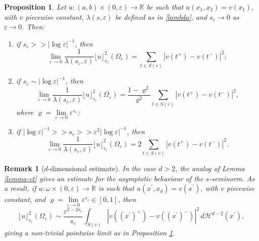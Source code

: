 \documentclass[11pt]{article}
\newtheorem{proposition}[definition]{Proposition}
\newtheorem{remark}[definition]{Remark}
\def\e{\varepsilon}
\begin{document}
\begin{proposition}\label{pconv} Let $u\colon (a,b)\times (0,\e)\to \mathbb R$ be such that $u(x_1,x_2)=v(x_1)$, with $v$ piecewise constant, $\lambda(s,\e)$ be defined as in \eqref{lambda}, and $s_\e\to 0$ as $\e\to 0$.  
Then: 
\begin{enumerate}
    \item[\rm (i)] if $s_\e>\!> |\log\e|^{-1}$, then 
    $$\lim_{\e\to 0}\frac{1}{\lambda(s_\e,\e)}\lfloor u \rfloor^2_{s_\e}(\Omega_\e)=\sum_{t\in S(v)}|v(t^+)-v(t^-)|^2;$$
    \item[\rm (ii)] if $s_\e\sim |\log\e|^{-1}$, then 
 $$\lim_{\e\to 0}\frac{1}{\lambda(s_\e,\e)}\lfloor u \rfloor^2_{s_\e}(\Omega_\e)=\frac{1-\varrho^2}{\varrho^2}\sum_{t\in S(v)}|v(t^+)-v(t^-)|^2,$$
    where $\varrho=\lim\limits_{\e\to 0}\e^{s_\e}$;
    \item[\rm(iii)] if $|\log\e|^{-1}>\!> s_\e >\!> \e^2 |\log\e|^{-1}$, then 
     $$\lim_{\e\to 0}\frac{1}{\lambda(s_\e,\e)}\lfloor u \rfloor^2_{s_\e}(\Omega_\e)=2\sum_{t\in S(v)}|v(t^+)-v(t^-)|^2.$$
\end{enumerate}
\end{proposition}


\begin{remark}[$d$-dimensional estimate]\label{rem-d}\rm 
In the case $d>2$, the analog of Lemma \ref{lemma-ct} gives an estimate for the asymptotic behaviour of the $s$-seminorm.  
As a result, if $u\colon \omega\times (0,\e)\to \mathbb R$ is such that $u(x^\prime,x_d)=v(x^\prime)$, with 
$v$ piecewise constant, and $\varrho=\lim\limits_{\e\to 0}\e^{s_\e}\in [0,1]$, then 
$$\lfloor u \rfloor_{s_\e}^2(\Omega_\e)\sim \frac{\e^{2-2s_\e}}{s_\e}\int_{S(v)} |v((x^\prime)^+)-v((x^\prime)^-)|^2\, d\mathcal H^{d-2}(x^\prime),$$ 
giving a non-trivial pointwise limit as in Proposition \ref{pconv}. 
\end{remark}



\end{document}
